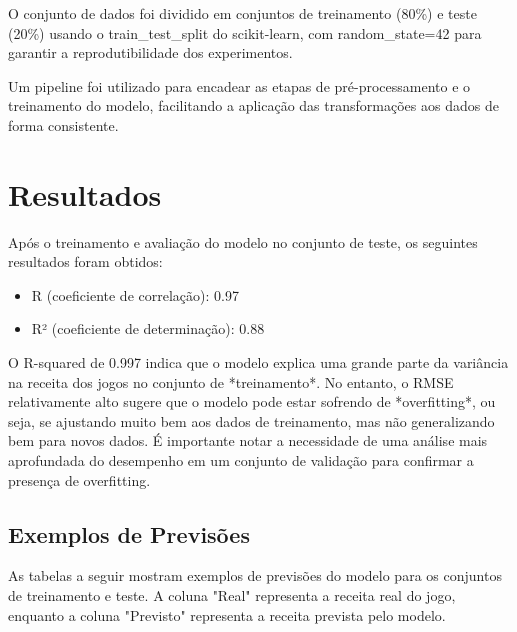 \documentclass[12pt]{article}
\begin{document}
O conjunto de dados foi dividido em conjuntos de treinamento (80\%) e teste (20\%) usando o train\_test\_split do scikit-learn, com random\_state=42 para garantir a reprodutibilidade dos experimentos.

Um pipeline foi utilizado para encadear as etapas de pré-processamento e o treinamento do modelo, facilitando a aplicação das transformações aos dados de forma consistente.

\section{Resultados}
Após o treinamento e avaliação do modelo no conjunto de teste, os seguintes resultados foram obtidos:

\begin{itemize}
\item R (coeficiente de correlação): 0.97
\item R² (coeficiente de determinação): 0.88
\end{itemize}

O R-squared de 0.997 indica que o modelo explica uma grande parte da variância na receita dos jogos no conjunto de *treinamento*. No entanto, o RMSE relativamente alto sugere que o modelo pode estar sofrendo de *overfitting*, ou seja, se ajustando muito bem aos dados de treinamento, mas não generalizando bem para novos dados.  É importante notar a necessidade de uma análise mais aprofundada do desempenho em um conjunto de validação para confirmar a presença de overfitting.

\subsection{Exemplos de Previsões}

As tabelas a seguir mostram exemplos de previsões do modelo para os conjuntos de treinamento e teste.  A coluna "Real" representa a receita real do jogo, enquanto a coluna "Previsto" representa a receita prevista pelo modelo.
\end{document}
